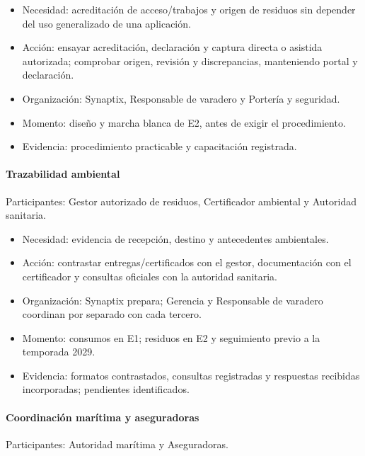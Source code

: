 \begin{itemize}
  \setlength{\itemsep}{2pt}
  \setlength{\parsep}{0pt}
  \item Necesidad: acreditación de acceso/trabajos y origen de residuos sin depender del uso generalizado de una aplicación.
  \item Acción: ensayar acreditación, declaración y captura directa o asistida autorizada; comprobar origen, revisión y discrepancias, manteniendo portal y declaración.
  \item Organización: Synaptix, Responsable de varadero y Portería y seguridad.
  \item Momento: diseño y marcha blanca de E2, antes de exigir el procedimiento.
  \item Evidencia: procedimiento practicable y capacitación registrada.
\end{itemize}

\paragraph{Trazabilidad ambiental}
\mbox{}\par
\noindent Participantes: Gestor autorizado de residuos, Certificador ambiental y Autoridad sanitaria.

\begin{itemize}
  \setlength{\itemsep}{2pt}
  \setlength{\parsep}{0pt}
  \item Necesidad: evidencia de recepción, destino y antecedentes ambientales.
  \item Acción: contrastar entregas/certificados con el gestor, documentación con el certificador y consultas oficiales con la autoridad sanitaria.
  \item Organización: Synaptix prepara; Gerencia y Responsable de varadero coordinan por separado con cada tercero.
  \item Momento: consumos en E1; residuos en E2 y seguimiento previo a la temporada 2029.
  \item Evidencia: formatos contrastados, consultas registradas y respuestas recibidas incorporadas; pendientes identificados.
\end{itemize}

\paragraph{Coordinación marítima y aseguradoras}
\mbox{}\par
\noindent Participantes: Autoridad marítima y Aseguradoras.

